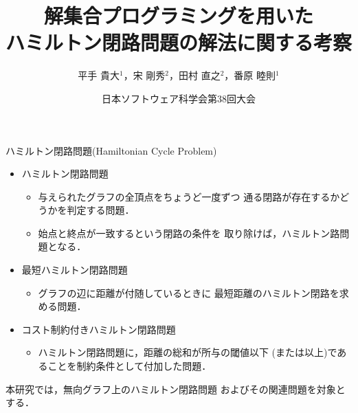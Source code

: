 \documentclass[dvipdfmx,10pt]{beamer}
\title{解集合プログラミングを用いた\\ハミルトン閉路問題の解法に関する考察}
\author{平手 貴大$^1$，宋 剛秀$^2$，田村 直之$^2$，番原 睦則$^1$}
\date{日本ソフトウェア科学会第38回大会}
\institute{1.名古屋大学 大学院情報学研究科 \\ 2.神戸大学 情報基盤センター}
\begin{document}
\frame{\maketitle}
\begin{frame}{ハミルトン閉路問題(Hamiltonian Cycle Problem)}
  \begin{itemize}
  \item \alert{ハミルトン閉路問題}
    \begin{itemize}
    \item 与えられたグラフの全頂点をちょうど一度ずつ
      通る閉路が存在するかどうかを判定する問題．
    \item 始点と終点が一致するという閉路の条件を
      取り除けば，ハミルトン路問題となる．
    \end{itemize}
  \item \alert{最短ハミルトン閉路問題}
    \begin{itemize}
    \item グラフの辺に距離が付随しているときに
      最短距離のハミルトン閉路を求める問題．
    \end{itemize}
  \item \alert{コスト制約付きハミルトン閉路問題}
    \begin{itemize}
    \item ハミルトン閉路問題に，距離の総和が所与の閾値以下
      (または以上)であることを制約条件として付加した問題．
    \end{itemize}
  \end{itemize}
  \begin{alertblock}{}
    本研究では，無向グラフ上のハミルトン閉路問題
    およびその関連問題を対象とする．    
  \end{alertblock}
\end{frame}
\end{document}
